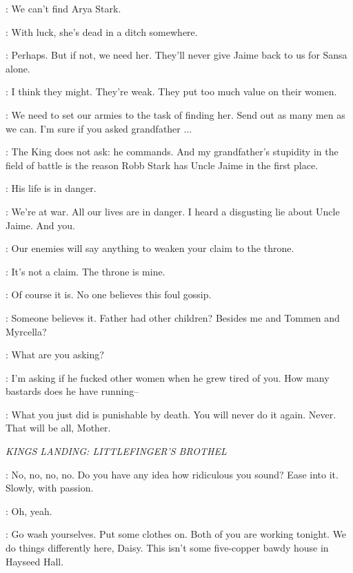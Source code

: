 \CERSEI: We can't find Arya Stark.

\JOFFREY: With luck, she's dead in a ditch somewhere.

\CERSEI: Perhaps. But if not, we need her. They'll never give Jaime back to us for Sansa alone.

\JOFFREY: I think they might. They're weak. They put too much value on their women.

\CERSEI: We need to set our armies to the task of finding her. Send out as many men as we can. I'm sure if you asked grandfather $\ldots$

\JOFFREY: The King does not ask: he commands. And my grandfather's stupidity in the field of battle is the reason Robb Stark has Uncle Jaime in the first place.

\CERSEI: His life is in danger.

\JOFFREY: We're at war. All our lives are in danger. I heard a disgusting lie about Uncle Jaime. And you.

\CERSEI: Our enemies will say anything to weaken your claim to the throne.

\JOFFREY: It's not a claim. The throne is mine.

\CERSEI: Of course it is. No one believes this foul gossip.

\JOFFREY: Someone believes it. Father had other children? Besides me and Tommen and Myrcella?

\CERSEI: What are you asking?

\JOFFREY: I'm asking if he fucked other women when he grew tired of you. How many bastards does he have running--


\JOFFREY: What you just did is punishable by death. You will never do it again. Never. That will be all, Mother.


\scene

\textit{KINGS LANDING: LITTLEFINGER'S BROTHEL}


\ROS: No, no, no, no. Do you have any idea how ridiculous you sound? Ease into it. Slowly, with passion.

\DAISY:  Oh, yeah.

\ROS: Go wash yourselves. Put some clothes on. Both of you are working tonight. We do things differently here, Daisy. This isn't some five-copper bawdy house in Hayseed Hall.

